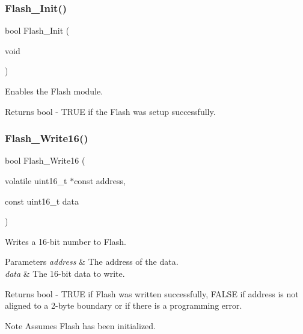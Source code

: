 \subsubsection{\texorpdfstring{Flash\+\_\+\+Init()}{Flash\_Init()}}
{\footnotesize\ttfamily bool Flash\+\_\+\+Init (\begin{DoxyParamCaption}\item[{void}]{ }\end{DoxyParamCaption})}



Enables the Flash module. 

\begin{DoxyReturn}{Returns}
bool -\/ T\+R\+UE if the Flash was setup successfully. 
\end{DoxyReturn}
\mbox{\label{group__main__module_ga1458f5e4ac15e1848ae0bde32fe5b5f3}} 
\subsubsection{\texorpdfstring{Flash\+\_\+\+Write16()}{Flash\_Write16()}}
{\footnotesize\ttfamily bool Flash\+\_\+\+Write16 (\begin{DoxyParamCaption}\item[{volatile uint16\+\_\+t $\ast$const}]{address,  }\item[{const uint16\+\_\+t}]{data }\end{DoxyParamCaption})}



Writes a 16-\/bit number to Flash. 


\begin{DoxyParams}{Parameters}
{\em address} & The address of the data. \\
\hline
{\em data} & The 16-\/bit data to write. \\
\hline
\end{DoxyParams}
\begin{DoxyReturn}{Returns}
bool -\/ T\+R\+UE if Flash was written successfully, F\+A\+L\+SE if address is not aligned to a 2-\/byte boundary or if there is a programming error. 
\end{DoxyReturn}
\begin{DoxyNote}{Note}
Assumes Flash has been initialized. 
\end{DoxyNote}
\mbox{\label{group__main__module_ga5da7dcc0c6ef765546c79bbe25b48479}} 
